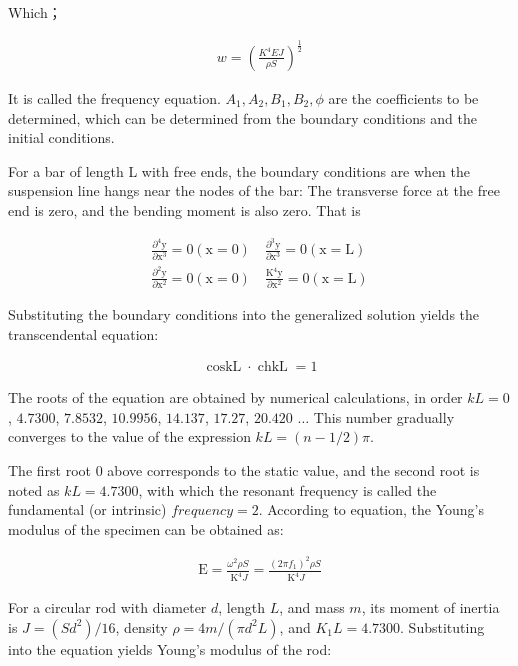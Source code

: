 \documentclass[UTF8]{article}
\begin{document}
    Which；
    
    \begin{eqnarray}
    w = (\frac{K^{4}EJ}{\rho S})^{\frac{1}{2}}
    \end{eqnarray}
    
    It is called the frequency equation. $A_1, A_2, B_1, B_2, \phi$ are the coefficients to be determined, which can be determined from the boundary conditions and the initial conditions.
    
    For a bar of length L with free ends, the boundary conditions are when the suspension line hangs near the nodes of the bar: The transverse force at the free end is zero, and the bending moment is also zero. That is
    
    \begin{eqnarray}
    \frac{\partial^{4} \mathrm{y}}{\partial \mathrm{x}^{3}}=0(\mathrm{x}=0) \quad \frac{\partial^{3} \mathrm{y}}{\partial \mathrm{x}^{3}}=0(\mathrm{x}=\mathrm{L}) \\
    \frac{\partial^{2} \mathrm{y}}{\partial \mathrm{x}^{2}}=0(\mathrm{x}=0) \quad \frac{\mathrm{K}^{4} \mathrm{y}}{\partial \mathrm{x}^{2}}=0(\mathrm{x}=\mathrm{L})
    \end{eqnarray}
    
    Substituting the boundary conditions into the generalized solution yields the transcendental equation:
    
    \begin{eqnarray}
    \operatorname{coskL} \cdot \operatorname{chkL}=1
    \end{eqnarray}
    
    The roots of the equation are obtained by numerical calculations, in order $kL = 0$, $4.7300$, $7.8532$, $10.9956$, $14. 137$, $17.27$, $20.420$ $\dots$ This number gradually converges to the value of the expression $kL=(n-1/2)\pi$.
    
    The first root $0$ above corresponds to the static value, and the second root is noted as $kL = 4.7300$, with which the resonant frequency is called the fundamental (or intrinsic) $frequency = 2$. According to equation, the Young's modulus of the specimen can be obtained as:
    
    \begin{eqnarray}
    \mathrm{E}=\frac{\omega^{2} \rho S}{\mathrm{~K}^{4} J}=\frac{\left(2 \pi f_{1}\right)^{2} \rho S}{\mathrm{~K}^{4} J}
    \end{eqnarray}
    
    For a circular rod with diameter $d$, length $L$, and mass $m$, its moment of inertia is $J = (Sd^2)/16$, density $\rho=4m/(\pi d^2 L)$, and $K_1L = 4.7300$. Substituting into the equation yields Young's modulus of the rod:
    
\end{document}
